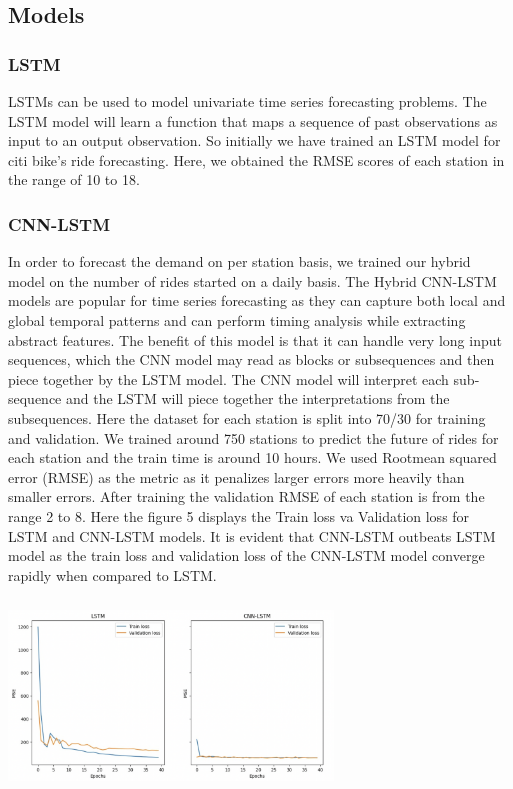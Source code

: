 \documentclass[journal]{vgtc}                     %
\begin{document}
\subsection{Models}
\subsubsection{LSTM}
    \item LSTMs can be used to model univariate time series forecasting problems.\cite{CNN} The LSTM model will learn a function that maps a sequence of past observations as input to an output observation. So initially we have trained an LSTM model for citi bike's ride forecasting. Here, we obtained the RMSE scores of each station in the range of 10 to 18.
\subsubsection{CNN-LSTM}
   \item In order to forecast the demand on per station basis, we trained our hybrid model on the number of rides started on a daily basis. \cite{CNN}The Hybrid CNN-LSTM models are popular for time series forecasting as they can capture both local and global temporal patterns and can perform timing analysis while extracting abstract features. The benefit of this model is that it can handle very long input sequences, which the CNN model may read as blocks or subsequences and then piece together by the LSTM model. The CNN model will interpret each sub-sequence and the LSTM will piece together the interpretations from the subsequences. Here the dataset for each station is split into 70/30 for training and validation. We trained around 750 stations to predict the future of rides for each station and the train time is around 10 hours. We used Rootmean squared error (RMSE) as the metric as it penalizes larger errors more heavily than smaller errors. After training the validation RMSE of each station is from the range 2 to 8. Here the figure 5 displays the Train loss va Validation loss for LSTM and CNN-LSTM models. It is evident that CNN-LSTM outbeats LSTM model as the train loss and validation loss of the CNN-LSTM model converge rapidly when compared to LSTM.
         
    \parbox{\linewidth}{
        \includegraphics[width=3.4in, height=2in]{figs/model.png}\\
    }
\end{document}

